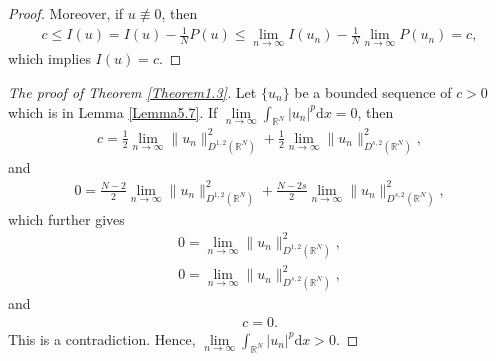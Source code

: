 \documentclass[12pt,a4paper,reqno]{amsart}
\numberwithin{equation}{section}
\begin{document}
\begin{proof}
Moreover, if $u\not\equiv0$, then
\begin{equation*}
\begin{aligned}
c
\leqslant
I(u)
=I(u)
-\frac{1}{N}P(u)
\leqslant
\lim_{n\rightarrow\infty}I(u_{n})
-\frac{1}{N}
\lim_{n\rightarrow\infty}
P(u_{n})
=c,
\end{aligned}
\end{equation*}
which implies
$I(u)=c$.
\end{proof}



\begin{proof}[The proof of Theorem \ref{Theorem1.3}]
Let
$\{u_{n}\}$
be a bounded sequence of
$c>0$ which is in Lemma \ref{Lemma5.7}.
If $\lim\limits_{n\to\infty}\int_{\mathbb{R}^{N}}
|u_{n}|^{p}
\mathrm{d}x=0$,
then
\begin{equation*}
\begin{aligned}
c=\frac{1}{2}\lim_{n\rightarrow\infty}\|u_{n}\|_{D^{1,2}(\mathbb{R}^{N})}^{2}
+
\frac{1}{2}\lim_{n\rightarrow\infty}\|u_{n}\|_{D^{s,2}(\mathbb{R}^{N})}^{2},
\end{aligned}
\end{equation*}
and
\begin{equation*}
\begin{aligned}
0=\frac{N-2}{2}
\lim_{n\rightarrow\infty}
\|u_{n}\|_{D^{1,2}(\mathbb{R}^{N})}^{2}
+
\frac{N-2s}{2}
\lim_{n\rightarrow\infty}
\|u_{n}\|_{D^{s,2}(\mathbb{R}^{N})}^{2},
\end{aligned}
\end{equation*}
which further gives
\begin{equation*}
\begin{aligned}
0=\lim_{n\rightarrow\infty}\|u_{n}\|_{D^{1,2}(\mathbb{R}^{N})}^{2},
\end{aligned}
\end{equation*}
\begin{equation*}
\begin{aligned}
0=
\lim_{n\rightarrow\infty}
\|u_{n}\|_{D^{s,2}(\mathbb{R}^{N})}^{2},
\end{aligned}
\end{equation*}
and
\begin{equation*}
\begin{aligned}
c=0.
\end{aligned}
\end{equation*}
This is a contradiction.
Hence,
$\lim\limits_{n\to\infty}\int_{\mathbb{R}^{N}}
|u_{n}|^{p}
\mathrm{d}x>0$.



\end{proof}
\end{document}
